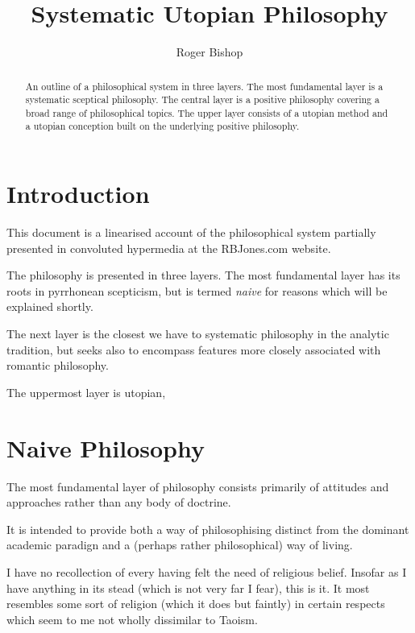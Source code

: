 \documentclass{rbjk}
\begin{document}
                                                                                   
\begin{article}
\begin{opening}  
\title{Systematic Utopian Philosophy}
\author{Roger Bishop }

\begin{abstract}
An outline of a philosophical system in three layers.
The most fundamental layer is a systematic sceptical philosophy.
The central layer is a positive philosophy covering a broad range of philosophical topics.
The upper layer consists of a utopian method and a utopian conception built on the underlying positive philosophy.
\end{abstract}
\end{opening}

\setcounter{tocdepth}{4}
{\parskip-0pt\tableofcontents}

\section{Introduction}

This document is a linearised account of the philosophical system partially presented in convoluted hypermedia at the RBJones.com website.

The philosophy is presented in three layers.
The most fundamental layer has its roots in pyrrhonean scepticism, but is termed {\it naive} for reasons which will be explained shortly.

The next layer is the closest we have to systematic philosophy in the analytic tradition, but seeks also to encompass features more closely associated with romantic philosophy.

The uppermost layer is utopian,

\section{Naive Philosophy}

The most fundamental layer of philosophy consists primarily of attitudes and approaches rather than any body of doctrine.

It is intended to provide both a way of philosophising distinct from the dominant academic paradign and a (perhaps rather philosophical) way of living.

I have no recollection of every having felt the need of religious belief.
Insofar as I have anything in its stead (which is not very far I fear), this is it.
It most resembles some sort of religion (which it does but faintly) in certain respects which seem to me not wholly dissimilar to Taoism.


\end{article}
\end{document}
